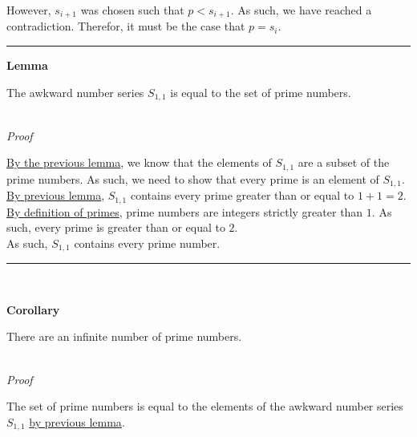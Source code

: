 \documentclass[a4paper,12pt]{article}
\begin{document}
\noindent However, $s_{i + 1}$ was chosen such that $p < s_{i + 1}$. As such, we have reached a contradiction. Therefor, it must be the case that $p = s_i$.

\begin{center}
\noindent\rule{8cm}{0.4pt}
\end{center}





\label{lemma:prime_asn}
\hypertarget{lemma:prime_asn}{}
\begin{tcolorbox}
\textbf{Lemma}

The awkward number series $S_{1, 1}$ is equal to the set of prime numbers.
\end{tcolorbox}

\noindent \\
\textit{Proof}

\noindent \hyperlink{lemma:asn_subset_prime}{By the previous lemma}, we know that the elements of $S_{1, 1}$ are a subset of the prime numbers. As such, we need to show that every prime is an element of $S_{1, 1}$.\\

\noindent \hyperlink{lemma:primes_in_asn}{By previous lemma}, $S_{1, 1}$ contains every prime greater than or equal to $1 + 1 = 2$.\\

\noindent \hyperlink{definition:prime_numbers}{By definition of primes}, prime numbers are integers strictly greater than $1$. As such, every prime is greater than or equal to $2$.\\

\noindent As such, $S_{1, 1}$ contains every prime number.

\begin{center}
\noindent\rule{8cm}{0.4pt}
\end{center}
\noindent \\





\label{corollary:infinite_primes}
\hypertarget{corollary:infinite_primes}{}
\begin{tcolorbox}
\textbf{Corollary}

There are an infinite number of prime numbers.
\end{tcolorbox}

\noindent \\
\textit{Proof}

\noindent The set of prime numbers is equal to the elements of the awkward number series $S_{1, 1}$ \hyperlink{lemma:prime_asn}{by previous lemma}.\\
\end{document}
